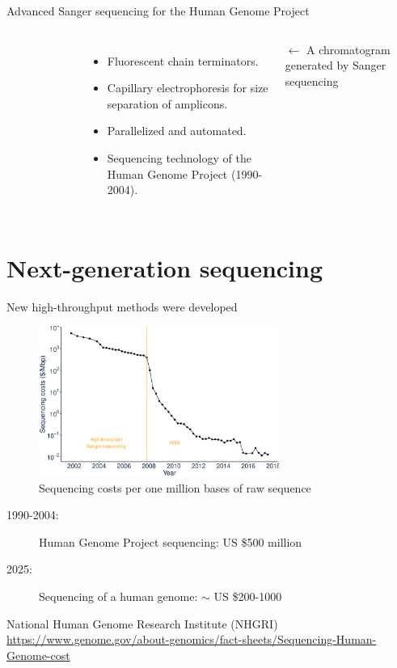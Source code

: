 \documentclass[10pt]{beamer}
\newcommand{\credit}[1]{{\vspace{\fill} \par \raggedleft \scriptsize \mdseries \color{mDarkBrown} #1 \par}}
\begin{document}
\begin{frame}{Advanced Sanger sequencing for the Human Genome Project}
\begin{columns}[T,onlytextwidth]
\begin{figure}
		\end{figure}
		\vspace{0.2cm}
		\begin{itemize}
			\item Fluorescent chain terminators.
			\item Capillary electrophoresis for size separation of amplicons.
			\item Parallelized and automated.
			\item Sequencing technology of the Human Genome Project (1990-2004).
		\end{itemize}
		\par \vspace{0.5cm}
		\credit{$\leftarrow$ A chromatogram generated by Sanger sequencing}
	\end{columns}
\end{frame}


\section{Next-generation sequencing}


\begin{frame}{New high-throughput methods were developed}
	\begin{center}
		 \begin{figure}
		\includegraphics[width=0.7\textwidth]{./figures/sequencingcosts2018eng.pdf}
		\caption{Sequencing costs per one million bases of raw sequence}
		\end{figure}
	\end{center}
    \begin{description}
	\item [1990-2004:] Human Genome Project sequencing: US \$500 million
	\item [2025:] Sequencing of a human genome: $\sim$ US \$200-1000
\end{description}
	\credit{National Human Genome Research Institute (NHGRI) \linebreak \href{https://www.genome.gov/about-genomics/fact-sheets/Sequencing-Human-Genome-cost}{https://www.genome.gov/about-genomics/fact-sheets/Sequencing-Human-Genome-cost}}
\end{frame}
\end{document}
